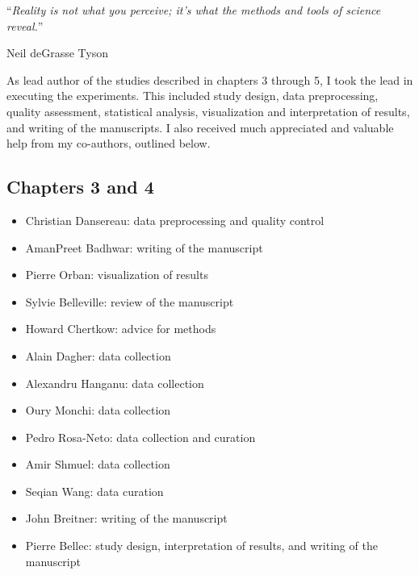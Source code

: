 \documentclass[
12pt, %
oneside, %
english, %
onehalfspacing, %
liststotoc, %
toctotoc, %
headsepline, %
consistentlayout, %
]{McGillThesis} %
\begin{document}
\vspace*{0.2\textheight}

\noindent\enquote{\itshape Reality is not what you perceive; it's what the methods and tools of science reveal.}\bigbreak

\hfill Neil deGrasse Tyson


\begin{contributions}
\addchaptertocentry{\contribs} %
As lead author of the studies described in chapters 3 through 5, I took the lead in executing the experiments. This included study design, data preprocessing, quality assessment, statistical analysis, visualization and interpretation of results, and writing of the manuscripts. I also received much appreciated and valuable help from my co-authors, outlined below.


\subsection*{Chapters 3 and 4}
\begin{itemize}
\setlength\itemsep{0em}
  \item Christian Dansereau: data preprocessing and quality control
  \item AmanPreet Badhwar: writing of the manuscript
  \item Pierre Orban: visualization of results
  \item Sylvie Belleville: review of the manuscript
  \item Howard Chertkow: advice for methods
  \item Alain Dagher: data collection
  \item Alexandru Hanganu: data collection
  \item Oury Monchi: data collection
  \item Pedro Rosa-Neto: data collection and curation
  \item Amir Shmuel: data collection
  \item Seqian Wang: data curation
  \item John Breitner: writing of the manuscript
  \item Pierre Bellec: study design, interpretation of results, and writing of the manuscript
\end{itemize}


\end{contributions}
\end{document}
